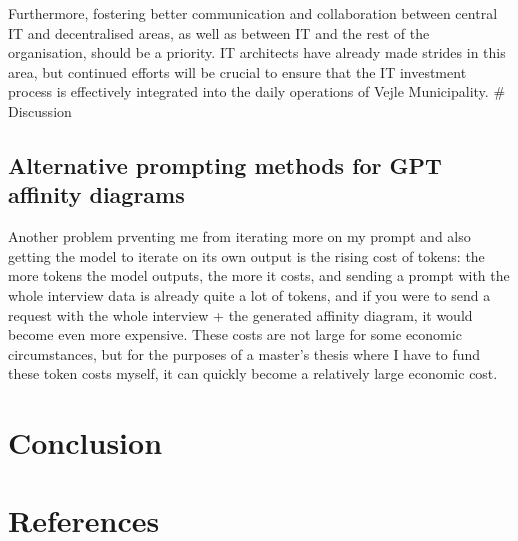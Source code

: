 \documentclass[
]{book}
\begin{document}
Furthermore, fostering better communication and collaboration between central IT and decentralised areas, as well as between IT and the rest of the organisation, should be a priority. IT architects have already made strides in this area, but continued efforts will be crucial to ensure that the IT investment process is effectively integrated into the daily operations of Vejle Municipality. \# Discussion

\hypertarget{alternative-prompting-methods-for-gpt-affinity-diagrams}{%
\subsection{Alternative prompting methods for GPT affinity diagrams}\label{alternative-prompting-methods-for-gpt-affinity-diagrams}}

Another problem prventing me from iterating more on my prompt and also getting the model to iterate on its own output is the rising cost of tokens: the more tokens the model outputs, the more it costs, and sending a prompt with the whole interview data is already quite a lot of tokens, and if you were to send a request with the whole interview + the generated affinity diagram, it would become even more expensive. These costs are not large for some economic circumstances, but for the purposes of a master's thesis where I have to fund these token costs myself, it can quickly become a relatively large economic cost.

\hypertarget{conclusion}{%
\section{Conclusion}\label{conclusion}}

\hypertarget{references}{%
\section{References}\label{references}}
\end{document}
